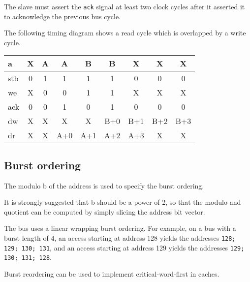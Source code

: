 \documentclass[a4paper,11pt]{article}
\begin{document}
The slave must assert the \verb!ack! signal at least two clock cycles after it asserted it to acknowledge the previous bus cycle.

The following timing diagram shows a read cycle which is overlapped by a write cycle.

\begin{tabular}{|l|c|c|c|c|c|c|c|c|}
\hline
a & X & A & A & B & B & X & X & X\\
\hline
stb & 0 & 1 & 1 & 1 & 1 & 0 & 0 & 0\\
\hline
we & X & 0 & 0 & 1 & 1 & X & X & X \\
\hline
ack & 0 & 0 & 1 & 0 & 1 & 0 & 0 & 0 \\
\hline
dw & X & X & X & X & B+0 & B+1 & B+2 & B+3 \\
\hline
dr & X & X & A+0 & A+1 & A+2 & A+3 & X & X \\
\hline
\end{tabular}


\subsection{Burst ordering}
The modulo b of the address is used to specify the burst ordering.

It is strongly suggested that b should be a power of 2, so that the modulo and quotient can be computed by simply slicing the address bit vector.

The bus uses a linear wrapping burst ordering. For example, on a bus with a burst length of 4, an access starting at address 128 yields the addresses \verb!128; 129; 130; 131!, and an access starting at address 129 yields the addresses \verb!129; 130; 131; 128!.

Burst reordering can be used to implement critical-word-first in caches.
\end{document}

